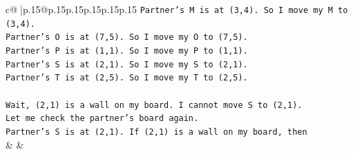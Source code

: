 \documentclass{article}
\begin{document}
{\begin{supertabular}{c@{$\;$}|p{.15\linewidth}@{}p{.15\linewidth}p{.15\linewidth}p{.15\linewidth}p{.15\linewidth}p{.15\linewidth}}
{{{\texttt{Partner's M is at (3,4). So I move my M to (3,4).} \\
\texttt{Partner's O is at (7,5). So I move my O to (7,5).} \\
\texttt{Partner's P is at (1,1). So I move my P to (1,1).} \\
\texttt{Partner's S is at (2,1). So I move my S to (2,1).} \\
\texttt{Partner's T is at (2,5). So I move my T to (2,5).} \\
\\ 
\texttt{Wait, (2,1) is a wall on my board. I cannot move S to (2,1).} \\
\texttt{Let me check the partner's board again.} \\
\texttt{Partner's S is at (2,1). If (2,1) is a wall on my board, then} \\
            }
        }
    }
    & & \\ \\


\end{supertabular}}
\end{document}
